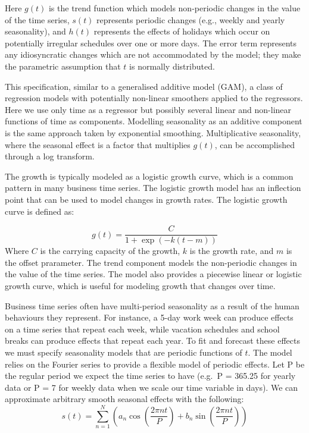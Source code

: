 \documentclass[mstat,12pt]{unswthesis}
\begin{document}
Here \(g(t)\) is the trend function which models non-periodic changes in
the value of the time series, \(s(t)\) represents periodic changes
(e.g., weekly and yearly seasonality), and \(h(t)\) represents the
effects of holidays which occur on potentially irregular schedules over
one or more days. The error term represents any idiosyncratic changes
which are not accommodated by the model; they make the parametric
assumption that \(t\) is normally distributed.

This specification, similar to a generalised additive model (GAM), a
class of regression models with potentially non-linear smoothers applied
to the regressors. Here we use only time as a regressor but possibly
several linear and non-linear functions of time as components. Modelling
seasonality as an additive component is the same approach taken by
exponential smoothing. Multiplicative seasonality, where the seasonal
effect is a factor that multiplies \(g(t)\), can be accomplished through
a log transform.

The growth is typically modeled as a logistic growth curve, which is a
common pattern in many business time series. The logistic growth model
has an inflection point that can be used to model changes in growth
rates. The logistic growth curve is defined as:

\[
g(t) = \frac{C}{1 + \exp(-k(t - m))}
\] Where \(C\) is the carrying capacity of the growth, \(k\) is the
growth rate, and \(m\) is the offset prarameter. The trend component
models the non-periodic changes in the value of the time series. The
model also provides a piecewise linear or logistic growth curve, which
is useful for modeling growth that changes over time.

Business time series often have multi-period seasonality as a result of
the human behaviours they represent. For instance, a 5-day work week can
produce effects on a time series that repeat each week, while vacation
schedules and school breaks can produce effects that repeat each year.
To fit and forecast these effects we must specify seasonality models
that are periodic functions of \(t\). The model relies on the Fourier
series to provide a flexible model of periodic effects. Let P be the
regular period we expect the time series to have (e.g.~P = 365.25 for
yearly data or P = 7 for weekly data when we scale our time variable in
days). We can approximate arbitrary smooth seasonal effects with the
following: \[
s(t) = \sum_{n=1}^{N} (a_n \cos(\frac{2\pi nt}{P}) + b_n \sin(\frac{2\pi nt}{P}))
\]
\end{document}
